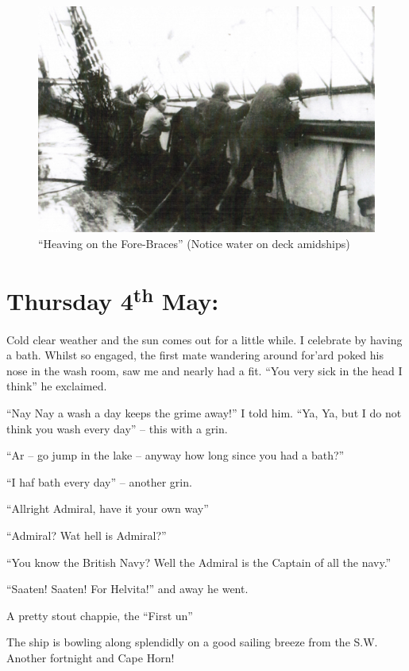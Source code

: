 \documentclass[
  11pt,
  msmallroyalvopaper
]{memoir}
\begin{document}
\begin{figure}
\centering
\includegraphics{./images/image009.png}
\caption{``Heaving on the Fore-Braces'' (Notice water on deck
amidships)}
\end{figure}

\hypertarget{thursday-4th-may}{%
\section{\texorpdfstring{Thursday 4\textsuperscript{th}
May:}{Thursday 4th May:}}\label{thursday-4th-may}}

Cold clear weather and the sun comes out for a little while. I celebrate
by having a bath. Whilst so engaged, the first mate wandering around
for'ard poked his nose in the wash room, saw me and nearly had a fit.
``You very sick in the head I think'' he exclaimed.

``Nay Nay a wash a day keeps the grime away!'' I told him. ``Ya, Ya, but
I do not think you wash every day'' -- this with a grin.

``Ar -- go jump in the lake -- anyway how long since you had a bath?''

``I haf bath every day'' -- another grin.

``Allright Admiral, have it your own way''

``Admiral? Wat hell is Admiral?''

``You know the British Navy? Well the Admiral is the Captain of all the
navy.''

``Saaten! Saaten! For Helvita!'' and away he went.

A pretty stout chappie, the ``First un''

The ship is bowling along splendidly on a good sailing breeze from the
S.W. Another fortnight and Cape Horn!
\end{document}
